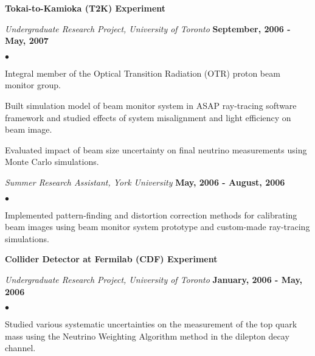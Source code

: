 \documentclass[margin,line]{res}
\newenvironment{list2}{
  \begin{list}{$\bullet$}{%
      \setlength{\itemsep}{0in}
      \setlength{\parsep}{0in} \setlength{\parskip}{0in}
      \setlength{\topsep}{0in} \setlength{\partopsep}{0in}
      \setlength{\leftmargin}{0.2in}}}{\end{list}}
\begin{document}
\begin{resume}
{\bf Tokai-to-Kamioka (T2K) Experiment}

\vspace{-.3cm}
{\em Undergraduate Research Project, University of Toronto} \hfill {\bf September, 2006 - May, 2007}\\
\vspace*{-2mm}
\begin{list2}
\item Integral member of the Optical Transition Radiation (OTR) proton beam monitor group.
\item Built simulation model of beam monitor system in
  ASAP\textsuperscript{\texttrademark} ray-tracing software framework
  and studied effects of system misalignment and light efficiency on
  beam image.
\item Evaluated impact of beam size uncertainty on final neutrino
  measurements using Monte Carlo simulations.
\end{list2}

{\em Summer Research Assistant, York University} \hfill {\bf May, 2006
  - August, 2006}\\
\vspace*{-2mm}
\begin{list2}
\item Implemented pattern-finding and distortion correction methods
  for calibrating beam images using beam monitor system prototype and
  custom-made ray-tracing simulations.
\end{list2}


{\bf Collider Detector at Fermilab (CDF) Experiment}

\vspace{-.3cm}
{\em Undergraduate Research Project, University of Toronto} \hfill {\bf January, 2006 - May, 2006}\\
\vspace*{-2mm}
\begin{list2}
\item Studied various systematic uncertainties on the measurement of
  the top quark mass using the Neutrino Weighting Algorithm method in
  the dilepton decay channel.
\end{list2}


\end{resume}
\end{document}
